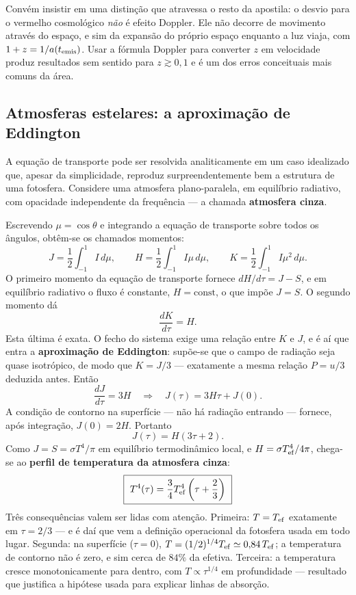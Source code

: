 \documentclass[11pt,a4paper]{article}
\begin{document}
Convém insistir em uma distinção que atravessa o resto da apostila: o desvio para o vermelho cosmológico \emph{não} é efeito Doppler. Ele não decorre de movimento através do espaço, e sim da expansão do próprio espaço enquanto a luz viaja, com $1+z=1/a(t_{\rm emis})$. Usar a fórmula Doppler para converter $z$ em velocidade produz resultados sem sentido para $z\gtrsim0{,}1$ e é um dos erros conceituais mais comuns da área.


\subsection*{Atmosferas estelares: a aproximação de Eddington}

A equação de transporte pode ser resolvida analiticamente em um caso idealizado que, apesar da simplicidade, reproduz surpreendentemente bem a estrutura de uma fotosfera. Considere uma atmosfera plano-paralela, em equilíbrio radiativo, com opacidade independente da frequência --- a chamada \textbf{atmosfera cinza}.

Escrevendo $\mu=\cos\theta$ e integrando a equação de transporte sobre todos os ângulos, obtêm-se os chamados momentos:
\[
J=\frac{1}{2}\int_{-1}^{1}I\,d\mu,
\qquad
H=\frac{1}{2}\int_{-1}^{1}I\mu\,d\mu,
\qquad
K=\frac{1}{2}\int_{-1}^{1}I\mu^{2}\,d\mu.
\]
O primeiro momento da equação de transporte fornece $dH/d\tau=J-S$, e em equilíbrio radiativo o fluxo é constante, $H=\text{const}$, o que impõe $J=S$. O segundo momento dá
\[
\frac{dK}{d\tau}=H.
\]
Esta última é exata. O fecho do sistema exige uma relação entre $K$ e $J$, e é aí que entra a \textbf{aproximação de Eddington}: supõe-se que o campo de radiação seja quase isotrópico, de modo que $K=J/3$ --- exatamente a mesma relação $P=u/3$ deduzida antes. Então
\[
\frac{dJ}{d\tau}=3H
\quad\Longrightarrow\quad
J(\tau)=3H\tau+J(0).
\]
A condição de contorno na superfície --- não há radiação entrando --- fornece, após integração, $J(0)=2H$. Portanto
\[
J(\tau)=H\left(3\tau+2\right).
\]
Como $J=S=\sigma T^{4}/\pi$ em equilíbrio termodinâmico local, e $H=\sigma T_{\rm ef}^{4}/4\pi$, chega-se ao \textbf{perfil de temperatura da atmosfera cinza}:
\[
\boxed{\ T^{4}(\tau)=\frac{3}{4}T_{\rm ef}^{4}\left(\tau+\frac{2}{3}\right)\ }
\]
Três consequências valem ser lidas com atenção. Primeira: $T=T_{\rm ef}$ exatamente em $\tau=2/3$ --- e é daí que vem a definição operacional da fotosfera usada em todo lugar. Segunda: na superfície ($\tau=0$), $T=(1/2)^{1/4}T_{\rm ef}\simeq0{,}84\,T_{\rm ef}$; a temperatura de contorno não é zero, e sim cerca de $84\%$ da efetiva. Terceira: a temperatura cresce monotonicamente para dentro, com $T\propto\tau^{1/4}$ em profundidade --- resultado que justifica a hipótese usada para explicar linhas de absorção.
\end{document}
